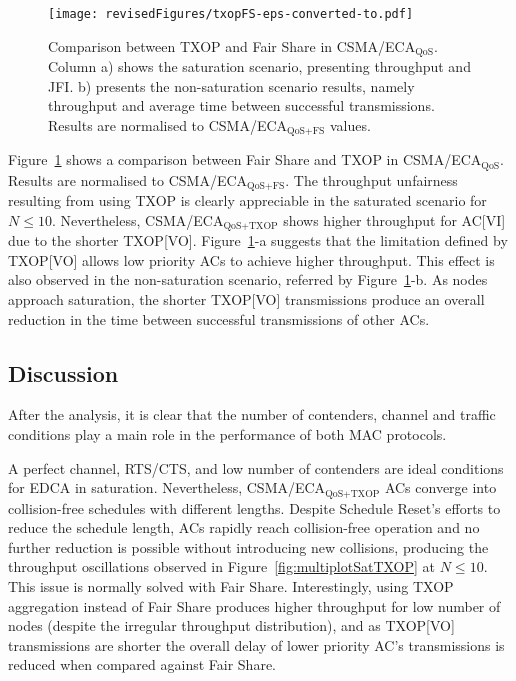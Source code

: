 \documentclass[a4paper]{article}
\begin{document}
	\begin{figure}[t]
	\centering
		\texttt{[image: revisedFigures/txopFS-eps-converted-to.pdf]}
		\caption{Comparison between TXOP and Fair Share in CSMA/ECA$_\text{QoS}$. Column a) shows the saturation scenario, presenting throughput and JFI. b) presents the non-saturation scenario results, namely throughput and average time between successful transmissions. Results are normalised to CSMA/ECA$_\text{QoS+FS}$ values.}
		\label{txopFS}
	\end{figure}

Figure~\ref{txopFS} shows a comparison between Fair Share and TXOP in CSMA/ECA$_\text{QoS}$. Results are normalised to CSMA/ECA$_\text{QoS+FS}$. The throughput unfairness resulting from using TXOP is clearly appreciable in the saturated scenario for $N\le10$. Nevertheless, CSMA/ECA$_\text{QoS+TXOP}$ shows higher throughput for AC[VI] due to the shorter TXOP[VO]. Figure~\ref{txopFS}-a suggests that the limitation defined by TXOP[VO] allows low priority ACs to achieve higher throughput. This effect is also observed in the non-saturation scenario, referred by Figure~\ref{txopFS}-b. As nodes approach saturation, the shorter TXOP[VO] transmissions  produce an overall reduction in the time between successful transmissions of other ACs.

\subsection{Discussion}
After the analysis, it is clear that the number of contenders, channel and traffic conditions play a main role in the performance of both MAC protocols. 

A perfect channel, RTS/CTS, and low number of contenders are ideal conditions for EDCA in saturation. Nevertheless, CSMA/ECA$_{\text{QoS+TXOP}}$ ACs converge into collision-free schedules with different lengths. Despite Schedule Reset's efforts to reduce the schedule length, ACs rapidly reach collision-free operation and no further reduction is possible without introducing new collisions, producing the throughput oscillations observed in Figure~\ref{fig:multiplotSatTXOP} at $N\le10$. This issue is normally solved with Fair Share. Interestingly, using TXOP aggregation instead of Fair Share produces higher throughput for low number of nodes (despite the irregular throughput distribution), and as TXOP[VO] transmissions are shorter the overall delay of lower priority AC's transmissions is reduced when compared against Fair Share.
\end{document}
